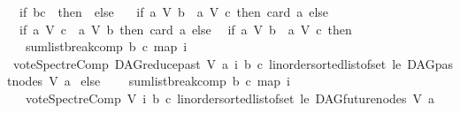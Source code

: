 \begin{isabellebody}
\ \ if\ {\isacharparenleft}{\kern0pt}b{\isacharequal}{\kern0pt}c{\isacharparenright}{\kern0pt}\ \ then\ {}\ else\ \isanewline
\ \ if\ {\isacharparenleft}{\kern0pt}{\isacharparenleft}{\kern0pt}a\ {\isasymrightarrow}\isactrlsup {\isacharasterisk}{\kern0pt}\isactrlbsub V\isactrlesub \ b{\isacharparenright}{\kern0pt}\ {\isasymand}\ {\isasymnot}{\isacharparenleft}{\kern0pt}a\ {\isasymrightarrow}\isactrlsup {\isacharplus}{\kern0pt}\isactrlbsub V\isactrlesub \ c{\isacharparenright}{\kern0pt}{\isacharparenright}{\kern0pt}\ then\ card\ a\ else\isanewline
\ \ if\ {\isacharparenleft}{\kern0pt}{\isacharparenleft}{\kern0pt}a\ {\isasymrightarrow}\isactrlsup {\isacharasterisk}{\kern0pt}\isactrlbsub V\isactrlesub \ c{\isacharparenright}{\kern0pt}\ {\isasymand}\ {\isasymnot}{\isacharparenleft}{\kern0pt}a\ {\isasymrightarrow}\isactrlsup {\isacharplus}{\kern0pt}\isactrlbsub V\isactrlesub \ b{\isacharparenright}{\kern0pt}{\isacharparenright}{\kern0pt}\ then\ card\ a\ else\isanewline
\ \ if\ {\isacharparenleft}{\kern0pt}{\isacharparenleft}{\kern0pt}a\ {\isasymrightarrow}\isactrlsup {\isacharplus}{\kern0pt}\isactrlbsub V\isactrlesub \ b{\isacharparenright}{\kern0pt}\ {\isasymand}\ {\isacharparenleft}{\kern0pt}a\ {\isasymrightarrow}\isactrlsup {\isacharplus}{\kern0pt}\isactrlbsub V\isactrlesub \ c{\isacharparenright}{\kern0pt}{\isacharparenright}{\kern0pt}\ then\ \isanewline
\ \ \ {\isacharparenleft}{\kern0pt}sumlist{\isacharunderscore}{\kern0pt}break{\isacharunderscore}{\kern0pt}comp\ b\ c\ {\isacharparenleft}{\kern0pt}map\ {\isacharparenleft}{\kern0pt}{\isasymlambda}i{\isachardot}{\kern0pt}\isanewline
\ {\isacharparenleft}{\kern0pt}vote{\isacharunderscore}{\kern0pt}SpectreComp\ {\isacharparenleft}{\kern0pt}DAG{\isachardot}{\kern0pt}reduce{\isacharunderscore}{\kern0pt}past\ V\ a{\isacharparenright}{\kern0pt}\ i\ b\ c{\isacharparenright}{\kern0pt}{\isacharparenright}{\kern0pt}\ {\isacharparenleft}{\kern0pt}linorder{\isachardot}{\kern0pt}sorted{\isacharunderscore}{\kern0pt}list{\isacharunderscore}{\kern0pt}of{\isacharunderscore}{\kern0pt}set\ le\ {\isacharparenleft}{\kern0pt}{\isacharparenleft}{\kern0pt}DAG{\isachardot}{\kern0pt}past{\isacharunderscore}{\kern0pt}nodes\ V\ a{\isacharparenright}{\kern0pt}{\isacharparenright}{\kern0pt}{\isacharparenright}{\kern0pt}{\isacharparenright}{\kern0pt}{\isacharparenright}{\kern0pt}\isanewline
\ else\ \isanewline
\ \ \ sumlist{\isacharunderscore}{\kern0pt}break{\isacharunderscore}{\kern0pt}comp\ b\ c\ {\isacharparenleft}{\kern0pt}map\ {\isacharparenleft}{\kern0pt}{\isasymlambda}i{\isachardot}{\kern0pt}\isanewline
\ \ \ {\isacharparenleft}{\kern0pt}vote{\isacharunderscore}{\kern0pt}SpectreComp\ V\ i\ b\ c{\isacharparenright}{\kern0pt}{\isacharparenright}{\kern0pt}\ {\isacharparenleft}{\kern0pt}linorder{\isachardot}{\kern0pt}sorted{\isacharunderscore}{\kern0pt}list{\isacharunderscore}{\kern0pt}of{\isacharunderscore}{\kern0pt}set\ le\ {\isacharparenleft}{\kern0pt}DAG{\isachardot}{\kern0pt}future{\isacharunderscore}{\kern0pt}nodes\ V\ a{\isacharparenright}{\kern0pt}{\isacharparenright}{\kern0pt}{\isacharparenright}{\kern0pt}{\isacharparenright}{\kern0pt}{\isachardoublequoteclose}\isanewline

\end{isabellebody}
